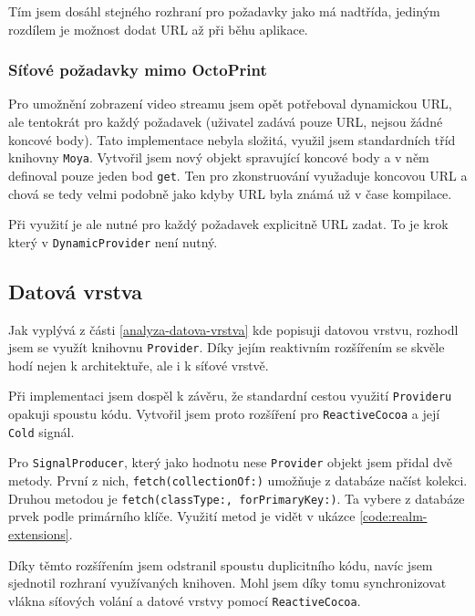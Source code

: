 Tím jsem dosáhl stejného rozhraní pro požadavky jako má nadtřída, jediným rozdílem je možnost dodat URL až při běhu aplikace.

\subsubsection*{Síťové požadavky mimo OctoPrint}

Pro umožnění zobrazení video streamu jsem opět potřeboval dynamickou URL, ale tentokrát pro každý požadavek (uživatel zadává pouze URL, nejsou žádné koncové body).
Tato implementace nebyla složitá, využil jsem standardních tříd knihovny \texttt{Moya}.
Vytvořil jsem nový objekt spravující koncové body a v něm definoval pouze jeden bod \texttt{get}.
Ten pro zkonstruování využaduje koncovou URL a chová se tedy velmi podobně jako kdyby URL byla známá už v čase kompilace.

Při využití je ale nutné pro každý požadavek explicitně URL zadat.
To je krok který v \texttt{DynamicProvider} není nutný.

\subsection{Datová vrstva}

Jak vyplývá z části \ref{analyza-datova-vrstva} kde popisuji datovou vrstvu, rozhodl jsem se využít knihovnu \texttt{Provider}.
Díky jejím reaktivním rozšířením se skvěle hodí nejen k architektuře, ale i k síťové vrstvě.

Při implementaci jsem dospěl k závěru, že standardní cestou využití \texttt{Provideru} opakuji spoustu kódu.
Vytvořil jsem proto rozšíření pro \texttt{ReactiveCocoa} a její \texttt{Cold} signál.

Pro \texttt{SignalProducer}, který jako hodnotu nese \texttt{Provider} objekt jsem přidal dvě metody.
První z nich, \texttt{fetch(collectionOf:)} umožňuje z databáze načíst kolekci.
Druhou metodou je \texttt{fetch(classType:, forPrimaryKey:)}.
Ta vybere z databáze prvek podle primárního klíče.
Využití metod je vidět v ukázce \ref{code:realm-extensions}.


Díky těmto rozšířením jsem odstranil spoustu duplicitního kódu, navíc jsem sjednotil rozhraní využívaných knihoven.
Mohl jsem díky tomu synchronizovat vlákna síťových volání a datové vrstvy pomocí \texttt{ReactiveCocoa}.

